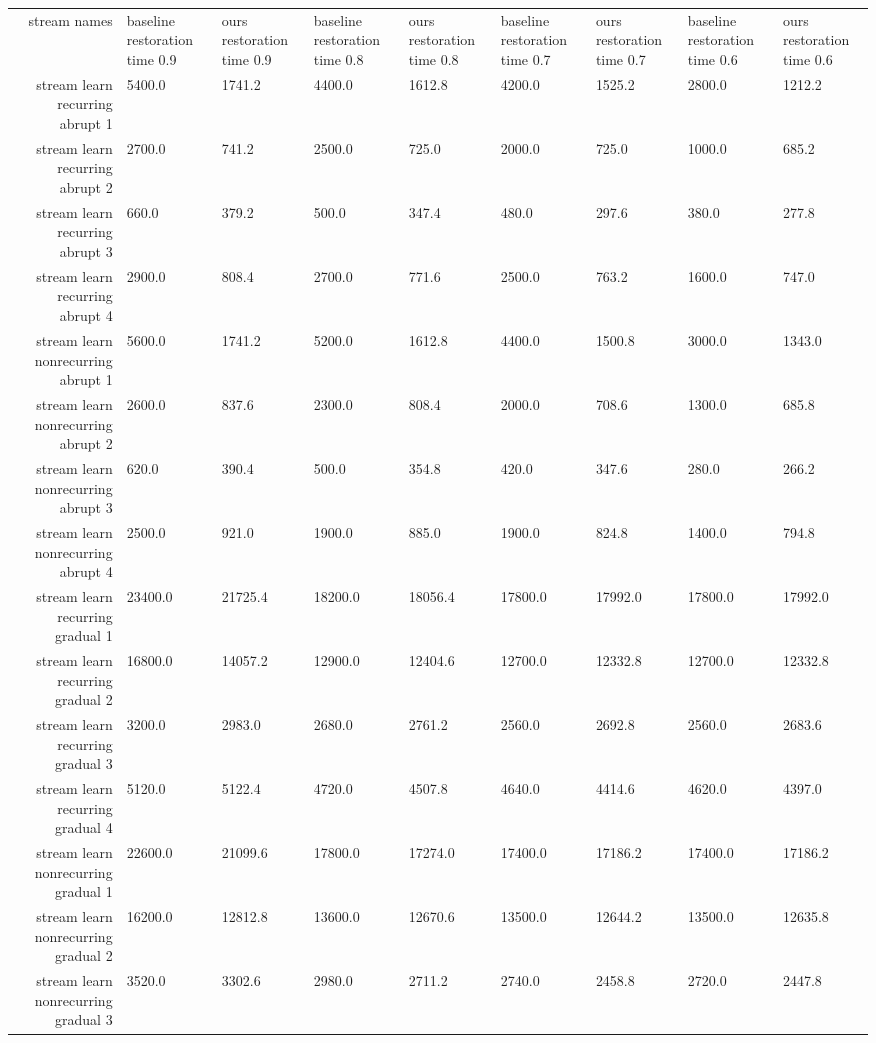 \begin{tabular}{|r|l|l|l|l|l|l|l|l|}
  \hline
  stream names & baseline restoration time 0.9 & ours restoration time 0.9 & baseline restoration time 0.8 & ours restoration time 0.8 & baseline restoration time 0.7 & ours restoration time 0.7 & baseline restoration time 0.6 & ours restoration time 0.6 \\ 
  stream learn recurring abrupt 1 & 5400.0 & 1741.2 & 4400.0 & 1612.8 & 4200.0 & 1525.2 & 2800.0 & 1212.2 \\ 
  stream learn recurring abrupt 2 & 2700.0 & 741.2 & 2500.0 & 725.0 & 2000.0 & 725.0 & 1000.0 & 685.2 \\ 
  stream learn recurring abrupt 3 & 660.0 & 379.2 & 500.0 & 347.4 & 480.0 & 297.6 & 380.0 & 277.8 \\ 
  stream learn recurring abrupt 4 & 2900.0 & 808.4 & 2700.0 & 771.6 & 2500.0 & 763.2 & 1600.0 & 747.0 \\ 
  stream learn nonrecurring abrupt 1 & 5600.0 & 1741.2 & 5200.0 & 1612.8 & 4400.0 & 1500.8 & 3000.0 & 1343.0 \\ 
  stream learn nonrecurring abrupt 2 & 2600.0 & 837.6 & 2300.0 & 808.4 & 2000.0 & 708.6 & 1300.0 & 685.8 \\ 
  stream learn nonrecurring abrupt 3 & 620.0 & 390.4 & 500.0 & 354.8 & 420.0 & 347.6 & 280.0 & 266.2 \\ 
  stream learn nonrecurring abrupt 4 & 2500.0 & 921.0 & 1900.0 & 885.0 & 1900.0 & 824.8 & 1400.0 & 794.8 \\ 
  stream learn recurring gradual 1 & 23400.0 & 21725.4 & 18200.0 & 18056.4 & 17800.0 & 17992.0 & 17800.0 & 17992.0 \\ 
  stream learn recurring gradual 2 & 16800.0 & 14057.2 & 12900.0 & 12404.6 & 12700.0 & 12332.8 & 12700.0 & 12332.8 \\ 
  stream learn recurring gradual 3 & 3200.0 & 2983.0 & 2680.0 & 2761.2 & 2560.0 & 2692.8 & 2560.0 & 2683.6 \\ 
  stream learn recurring gradual 4 & 5120.0 & 5122.4 & 4720.0 & 4507.8 & 4640.0 & 4414.6 & 4620.0 & 4397.0 \\ 
  stream learn nonrecurring gradual 1 & 22600.0 & 21099.6 & 17800.0 & 17274.0 & 17400.0 & 17186.2 & 17400.0 & 17186.2 \\ 
  stream learn nonrecurring gradual 2 & 16200.0 & 12812.8 & 13600.0 & 12670.6 & 13500.0 & 12644.2 & 13500.0 & 12635.8 \\ 
  stream learn nonrecurring gradual 3 & 3520.0 & 3302.6 & 2980.0 & 2711.2 & 2740.0 & 2458.8 & 2720.0 & 2447.8 \\ 

\end{tabular}
